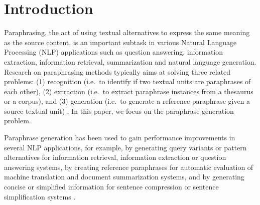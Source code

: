                                                            
 
\section{Introduction}
 
 
Paraphrasing, the act of using textual alternatives to express the same meaning as the source content, is an important subtask in various Natural Language Processing (NLP) applications such as question answering, information extraction, information retrieval, summarization and natural language generation. Research on paraphrasing methods typically aims at solving three related problems: (1) recognition (i.e.\ to identify if two textual units are paraphrases of each other), (2) extraction (i.e.\ to extract paraphrase instances from a thesaurus or a corpus), and (3) generation (i.e.\ to generate a reference paraphrase given a source textual unit) \cite{Madnani2010}. In this paper, we focus on the paraphrase generation problem.
 
Paraphrase generation has been used to gain performance improvements in several NLP applications, for example, by generating query variants or pattern alternatives for information retrieval, information extraction or question answering systems, by creating reference paraphrases for automatic evaluation of machine translation and document summarization systems, and by generating concise or simplified information for sentence compression or sentence simplification systems \cite{Madnani2010}.
 
